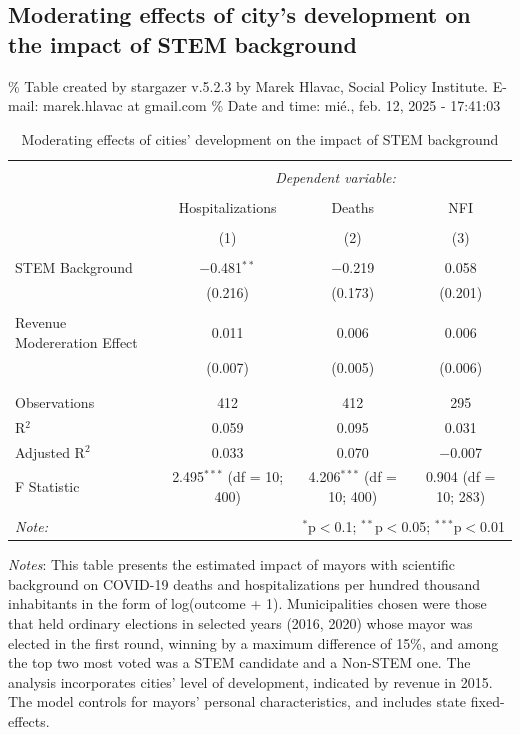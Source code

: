 \documentclass[
  letterpaper,
  DIV=11,
  numbers=noendperiod]{scrartcl}
\begin{document}
\subsection{Moderating effects of city's development on the impact of
STEM
background}\label{moderating-effects-of-citys-development-on-the-impact-of-stem-background}

\% Table created by stargazer v.5.2.3 by Marek Hlavac, Social Policy
Institute. E-mail: marek.hlavac at gmail.com \% Date and time: mié.,
feb. 12, 2025 - 17:41:03

\begin{table}[!htbp] \centering 
  \caption{Moderating effects of cities’ development on the impact of STEM background} 
  \label{} 
\begin{tabular}{@{\extracolsep{5pt}}lccc} 
\\[-1.8ex]\hline 
\hline \\[-1.8ex] 
 & \multicolumn{3}{c}{\textit{Dependent variable:}} \\ 
\cline{2-4} 
\\[-1.8ex] & Hospitalizations & Deaths & NFI \\ 
\\[-1.8ex] & (1) & (2) & (3)\\ 
\hline \\[-1.8ex] 
 STEM Background & $-$0.481$^{**}$ & $-$0.219 & 0.058 \\ 
  & (0.216) & (0.173) & (0.201) \\ 
  & & & \\ 
 Revenue Modereration Effect & 0.011 & 0.006 & 0.006 \\ 
  & (0.007) & (0.005) & (0.006) \\ 
  & & & \\ 
\hline \\[-1.8ex] 
Observations & 412 & 412 & 295 \\ 
R$^{2}$ & 0.059 & 0.095 & 0.031 \\ 
Adjusted R$^{2}$ & 0.033 & 0.070 & $-$0.007 \\ 
F Statistic & 2.495$^{***}$ (df = 10; 400) & 4.206$^{***}$ (df = 10; 400) & 0.904 (df = 10; 283) \\ 
\hline 
\hline \\[-1.8ex] 
\textit{Note:}  & \multicolumn{3}{r}{$^{*}$p$<$0.1; $^{**}$p$<$0.05; $^{***}$p$<$0.01} \\ 
\end{tabular} 
\end{table}

\emph{Notes}: This table presents the estimated impact of mayors with
scientific background on COVID-19 deaths and hospitalizations per
hundred thousand inhabitants in the form of log(outcome + 1).
Municipalities chosen were those that held ordinary elections in
selected years (2016, 2020) whose mayor was elected in the first round,
winning by a maximum difference of 15\%, and among the top two most
voted was a STEM candidate and a Non-STEM one. The analysis incorporates
cities' level of development, indicated by revenue in 2015. The model
controls for mayors' personal characteristics, and includes state
fixed-effects.
\end{document}
